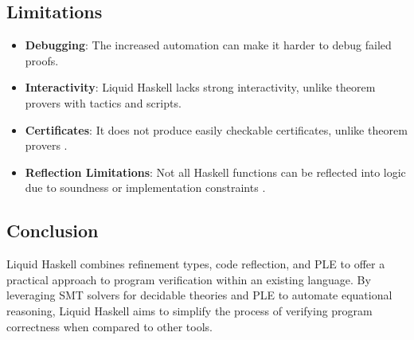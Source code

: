 \documentclass[]{rptuseminar}
\begin{document}
\subsection*{Limitations}

\begin{itemize}
    \item \textbf{Debugging}: The increased automation can make it harder to debug failed proofs.
    \item \textbf{Interactivity}: Liquid Haskell lacks strong interactivity, unlike theorem provers with tactics and scripts.
    \item \textbf{Certificates}: It does not produce easily checkable certificates, unlike theorem provers \cite{vazou_refinement_2018}.
    \item \textbf{Reflection Limitations}: Not all Haskell functions can be reflected into logic due to soundness or implementation constraints \cite{vazou_refinement_2018}.
\end{itemize}

\subsection*{Conclusion}

Liquid Haskell combines refinement types, code reflection, and PLE to offer a practical approach to program verification within an existing language. By leveraging SMT solvers for decidable theories and PLE to automate equational reasoning, Liquid Haskell aims to simplify the process of verifying program correctness when compared to other tools.
\label{sec:conclusions}

\newpage
\nocite{*}



\end{document}
